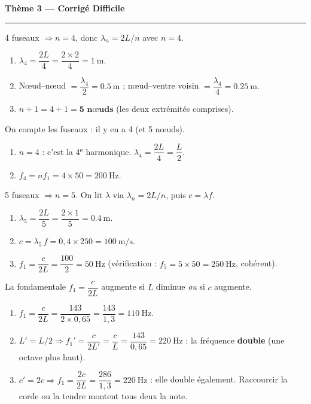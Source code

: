 \documentclass[11pt,a4paper]{article}
\begin{document}
\begin{center}
{\large\bfseries\color{excol} Thème 3 — Corrigé Difficile}\\[-2pt]
{\color{excol}\rule{5cm}{1pt}}
\end{center}

\begin{corrige}
4 fuseaux $\Rightarrow n=4$, donc $\lambda_n=2L/n$ avec $n=4$.
\begin{enumerate}[label=\alph*)]
  \item $\lambda_4=\dfrac{2L}{4}=\dfrac{2\times 2}{4}=\SI{1}{\metre}.$
  \item Nœud--nœud $=\dfrac{\lambda_4}{2}=\SI{0.5}{\metre}$ ;
        nœud--ventre voisin $=\dfrac{\lambda_4}{4}=\SI{0.25}{\metre}.$
  \item $n+1=4+1=\textbf{5 nœuds}$ (les deux extrémités comprises).
\end{enumerate}
\end{corrige}

\begin{corrige}
On compte les fuseaux : il y en a 4 (et 5 nœuds).
\begin{enumerate}[label=\alph*)]
  \item $n=4$ : c'est la 4\textsuperscript{e} harmonique. $\lambda_4=\dfrac{2L}{4}=\dfrac{L}{2}.$
  \item $f_4=n f_1=4\times 50=\SI{200}{\hertz}.$
\end{enumerate}
\end{corrige}

\begin{corrige}
5 fuseaux $\Rightarrow n=5$. On lit $\lambda$ via $\lambda_n=2L/n$, puis $c=\lambda f$.
\begin{enumerate}[label=\alph*)]
  \item $\lambda_5=\dfrac{2L}{5}=\dfrac{2\times 1}{5}=\SI{0.4}{\metre}.$
  \item $c=\lambda_5\,f=0{,}4\times 250=\SI{100}{\metre\per\second}.$
  \item $f_1=\dfrac{c}{2L}=\dfrac{100}{2}=\SI{50}{\hertz}$
        (vérification : $f_5=5\times 50=\SI{250}{\hertz}$, cohérent).
\end{enumerate}
\end{corrige}

\begin{corrige}
La fondamentale $f_1=\dfrac{c}{2L}$ augmente si $L$ diminue \emph{ou} si $c$ augmente.
\begin{enumerate}[label=\alph*)]
  \item $f_1=\dfrac{c}{2L}=\dfrac{143}{2\times 0{,}65}=\dfrac{143}{1{,}3}=\SI{110}{\hertz}.$
  \item $L'=L/2\Rightarrow f_1'=\dfrac{c}{2L'}=\dfrac{c}{L}=\dfrac{143}{0{,}65}=\SI{220}{\hertz}$ :
        la fréquence \textbf{double} (une octave plus haut).
  \item $c'=2c\Rightarrow f_1=\dfrac{2c}{2L}=\dfrac{286}{1{,}3}=\SI{220}{\hertz}$ : elle
        double également. Raccourcir la corde ou la tendre montent tous deux la note.
\end{enumerate}
\end{corrige}
\end{document}
